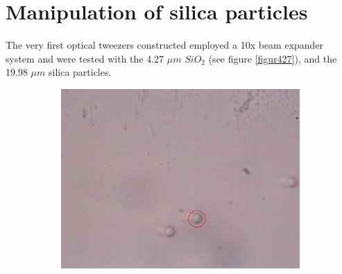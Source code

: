 \documentclass[letterpaper,12pt,oneside]{book}
\begin{document}
\section{Manipulation of silica particles}
The very first optical tweezers constructed employed a 10x beam expander system and were tested with the 4.27 $\mu m$ $SiO_2$ (see figure \ref{figur427}), and the 19.98 $\mu m$ silica particles.

\begin{figure}[H] 
  \begin{subfigure}[b]{0.5\linewidth}
    \centering
    \includegraphics[scale=0.22]{427particles/image732.png} 
    \caption{}
    

\end{subfigure}
\end{figure}
\end{document}
